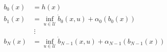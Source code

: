 \documentclass[preview]{standalone}
\begin{document}
\begin{align*}
b_0(x) &= h(x)\\ b_1(x) &= \inf_{u \in \mathcal{U}} \dot b_0(x, u) + \alpha_0 (b_0(x))\\ &\ \vdots\\ b_N(x) &= \inf_{u \in \mathcal{U}} \dot b_{N-1}(x, u) + \alpha_{N-1} (b_{N-1}(x))
\end{align*}
\end{document}
